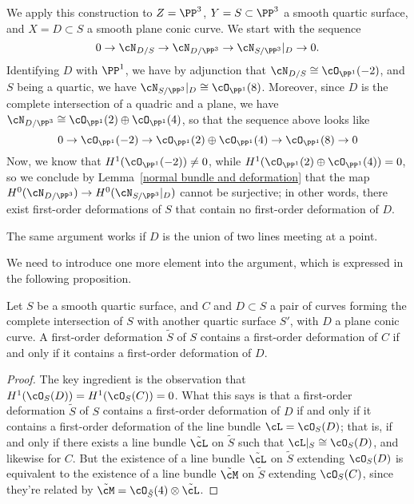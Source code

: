 We apply this construction to $Z = \PP^3$, $Y = S \subset \PP^3$ a smooth quartic surface, and $X = D \subset S$ a smooth plane conic curve. We start with the sequence
$$
0 \to \cN_{D/S} \to \cN_{D/\PP^3} \to \cN_{S/\PP^3}|_D \to 0.
$$
Identifying $D$ with $\PP^1$, we have by adjunction that $\cN_{D/S} \cong \cO_{\PP^1}(-2)$, and $S$ being a quartic, we have $\cN_{S/\PP^3}|_D \cong \cO_{\PP^1}(8)$. Moreover, since $D$ is the complete intersection of a quadric and a plane, we have $\cN_{D/\PP^3} \cong \cO_{\PP^1}(2) \oplus  \cO_{\PP^1}(4)$, so that the sequence above looks like
$$
0 \to \cO_{\PP^1}(-2) \to \cO_{\PP^1}(2) \oplus \cO_{\PP^1}(4) \to \cO_{\PP^1}(8) \to 0
$$
Now, we know that $H^1(\cO_{\PP^1}(-2)) \neq 0$, while $H^1(\cO_{\PP^1}(2) \oplus \cO_{\PP^1}(4)) = 0$, so we conclude by Lemma~\ref{normal bundle and deformation} that the map
$H^0(\cN_{D/\PP^3}) \to H^0(\cN_{S/\PP^3}|_D)$ cannot be surjective; in other words, there exist first-order deformations of $S$ that contain no first-order deformation of $D$.

The same argument works if $D$ is the union of two lines meeting at a point.

We need to introduce one more element into the argument, which is expressed in the following proposition.

\begin{proposition}
Let $S$ be a smooth quartic surface, and $C$ and $D \subset S$ a pair of curves forming the complete intersection of $S$ with another quartic surface $S'$, with $D$ a plane conic curve. A first-order deformation $\tilde S$ of $S$ contains a first-order deformation of $C$ if and only if it contains a first-order deformation of $D$.
\end{proposition}

\begin{proof}
The key ingredient is the observation that $H^1(\cO_S(D)) = H^1(\cO_S(C)) = 0$. What this says is that a first-order deformation $\tilde S$ of $S$ contains a first-order deformation of $D$ if and only if it contains a first-order deformation of the line bundle $\cL = \cO_S(D)$; that is, if and only if there exists a line bundle $\tilde \cL$ on $\tilde S$ such that $\cL|_S \cong \cO_S(D)$, and likewise for $C$. But the existence of a line bundle $\tilde \cL$ on $\tilde S$ extending $\cO_S(D)$ is equivalent to the existence of a line bundle $\tilde \cM$ on $\tilde S$ extending $\cO_S(C)$, since they're related by $\tilde \cM = \cO_{\tilde S}(4) \otimes \tilde \cL$.
\end{proof}

